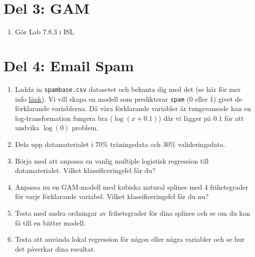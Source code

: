\documentclass[a4paper]{article}
\begin{document}
\section*{Del 3: GAM}
\begin{enumerate}
    \item Gör Lab 7.8.3 i ISL
\end{enumerate}

\section*{Del 4: Email Spam}
    \begin{enumerate}
        \item Ladda in \texttt{spambase.csv} datasetet och bekanta dig med det (se här för mer info \href{https://raw.githubusercontent.com/STIMALiU/732G12_DM/master/labs/Email_Spam_dataset_info.pdf}{länk}). Vi vill skapa en modell som predikterar \texttt{spam} (0 eller 1) givet de förklarande variablerna. Då våra förklarande variabler är tungsvansade kan en log-transformation fungera bra ($\log(x + 0.1)$) där vi lägger på $0.1$ för att undvika $\log(0)$ problem.
        \item Dela upp datamaterialet i 70\% träningsdata och 30\% valideringsdata.
        \item Börja med att anpassa en vanlig multiple logistisk regression till datamaterialet. Vilket klassificeringsfel får du?
        \item Anpassa nu en GAM-modell med kubiska natural splines med 4 frihetsgrader för varje förklarande variabel. Vilket klassificeringsfel får du nu?
        \item Testa med andra ordningar av frihetsgrader för dina splines och se om du kan få till en bättre modell.
        \item Testa att använda lokal regression för någon eller några variabler och se hur det påverkar dina resultat.
    \end{enumerate}
    
    
\end{document}
